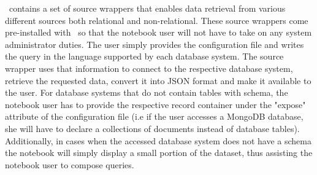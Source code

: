 \projname\ contains a set of source wrappers that enables data retrieval from various different sources both relational and non-relational. These source wrappers come pre-installed with \projname\ so that the notebook user will not have to take on any system administrator duties. The user simply provides the configuration file and writes the query in the language supported by each database system. The source wrapper uses that information to connect to the respective database system, retrieve the requested data, convert it into JSON format and make it available to the user. For database systems that do not contain tables with schema, the notebook user has to provide the respective record container under the "expose" attribute of the configuration file (i.e if the user accesses a MongoDB database, she will have to declare a collections of documents instead of database tables). Additionally, in cases when the accessed database system does not have a schema the notebook will simply display a small portion of the dataset, thus assisting the notebook user to compose queries.





